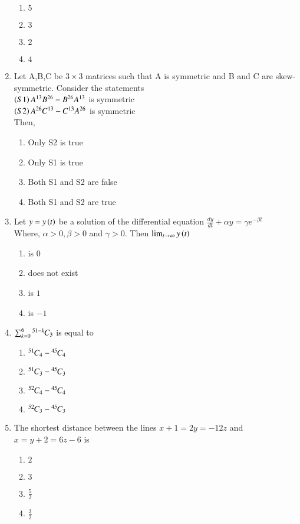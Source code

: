 \documentclass[journal,12pt,onecolumn]{IEEEtran}
\theoremstyle{remark}
\begin{document}
\begin{enumerate}
    \begin{enumerate}
        \item $5$
        \item $3$
        \item $2$
        \item $4$
    \end{enumerate}
    \item Let A,B,C be $3 \times 3$ matrices such that A is symmetric and B and C are skew-symmetric. Consider the statements\\
    $\left(S1\right)A^{13}B^{26}-B^{26}A^{13}$ is symmetric \\
    $\left(S2\right)A^{26}C^{13}-C^{13}A^{26}$ is symmetric\\
    Then,
    \begin{enumerate}
        \item Only S2 is true
        \item Only S1 is true
        \item Both S1 and S2 are false
        \item Both S1 and S2 are true
    \end{enumerate}
    \item Let $y=y\left(t\right)$ be a solution of the differential equation $\frac{dy}{dt}+\alpha y=\gamma e^{-\beta t}$\\
    Where, $\alpha >0, \beta >0$ and $\gamma >0$. Then $\lim_{t \to \infty}y\left(t\right)$
    \begin{enumerate}
        \item is $0$
        \item does not exist
        \item is $1$
        \item is $-1$
    \end{enumerate}
    \item $\sum_{k=0}^6 {{}^{51-k}\mkern-1muC_{3}}$ is equal to 
    \begin{enumerate}
        \item ${{}^{51}\mkern-1muC_{4}}-{{}^{45}\mkern-1muC_{4}}$
        \item ${{}^{51}\mkern-1muC_{3}}-{{}^{45}\mkern-1muC_{3}}$
        \item ${{}^{52}\mkern-1muC_{4}}-{{}^{45}\mkern-1muC_{4}}$
        \item ${{}^{52}\mkern-1muC_{3}}-{{}^{45}\mkern-1muC_{3}}$
    \end{enumerate}
    \item The shortest distance between the lines $x+1=2y=-12z$ and $x=y+2=6z-6$ is
    \begin{enumerate}
        \item $2$
        \item $3$
        \item $\frac{5}{2}$
        \item $\frac{3}{2}$
    \end{enumerate}
    








    
\end{enumerate}
\end{document}
